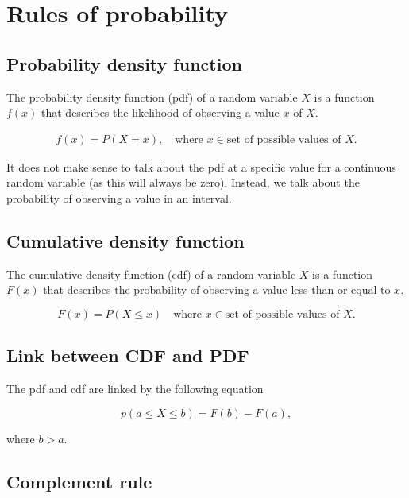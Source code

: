 
\section{Rules of probability}

\subsection{Probability density function}

The probability density function (pdf) of a random variable $X$ is a function $f(x)$ that describes the likelihood of observing a value $x$ of $X$.

\begin{align}
    f(x) = P(X=x), \quad 
    \text{where } x \in \text{set of possible values of } X.
\end{align}

It does not make sense to talk about the pdf at a specific value for a continuous random variable (as this will always be zero). Instead, we talk about the probability of observing a value in an interval.

\subsection{Cumulative density function}

The cumulative density function (cdf) of a random variable $X$ is a function $F(x)$ that describes the probability of observing a value less than or equal to $x$.

\begin{equation}
    F(x) = P(X \leq x)  
    \quad \text{where } x \in \text{set of possible values of } X.
\end{equation}

\subsection{Link between CDF and PDF}

The pdf and cdf are linked by the following equation

\begin{equation}
    p(a \leq X \leq b) = F(b) - F(a),
\end{equation}

where $b > a$. 

\subsection{Complement rule}

